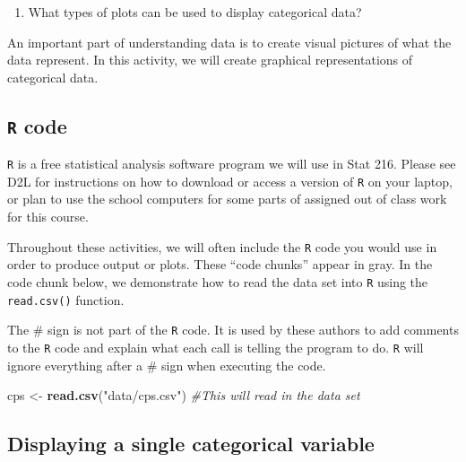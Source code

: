 \documentclass[
]{report}
\newenvironment{Shaded}{\begin{snugshade}}{\end{snugshade}}
\newcommand{\CommentTok}[1]{\textcolor[rgb]{0.56,0.35,0.01}{\textit{#1}}}
\newcommand{\KeywordTok}[1]{\textcolor[rgb]{0.13,0.29,0.53}{\textbf{#1}}}
\newcommand{\NormalTok}[1]{#1}
\newcommand{\StringTok}[1]{\textcolor[rgb]{0.31,0.60,0.02}{#1}}
\providecommand{\tightlist}{%
  \setlength{\itemsep}{0pt}\setlength{\parskip}{0pt}}
\begin{document}
\vspace{0.4in}

\begin{enumerate}
\def\labelenumi{\arabic{enumi}.}
\setcounter{enumi}{2}
\tightlist
\item
  What types of plots can be used to display categorical data?
\end{enumerate}

\vspace{0.5in}

An important part of understanding data is to create visual pictures of what the data represent. In this activity, we will create graphical representations of categorical data.

\hypertarget{r-code}{%
\subsection*{\texorpdfstring{\texttt{R} code}{R code}}\label{r-code}}

\texttt{R} is a free statistical analysis software program we will use in Stat 216. Please see D2L for instructions on how to download or
access a version of \texttt{R} on your laptop, or plan to use the school computers for some parts of assigned out of class work for this course.

Throughout these activities, we will often include the \texttt{R} code
you would use in order to produce output or plots. These
``code chunks'' appear in gray. In the code chunk below, we
demonstrate how to read the data set into \texttt{R} using the \texttt{read.csv()} function.

The \# sign is not part of the \texttt{R} code.
It is used by these authors to add comments to the \texttt{R} code and explain what each call is telling the program to do.
\texttt{R} will ignore everything after a \# sign when executing the code.

\begin{Shaded}
\begin{Highlighting}[]
\NormalTok{cps \textless{}{-}}\StringTok{ }\KeywordTok{read.csv}\NormalTok{(}\StringTok{"data/cps.csv"}\NormalTok{) }\CommentTok{\#This will read in the data set}
\end{Highlighting}
\end{Shaded}

\hypertarget{displaying-a-single-categorical-variable}{%
\subsection*{Displaying a single categorical variable}\label{displaying-a-single-categorical-variable}}
\end{document}
